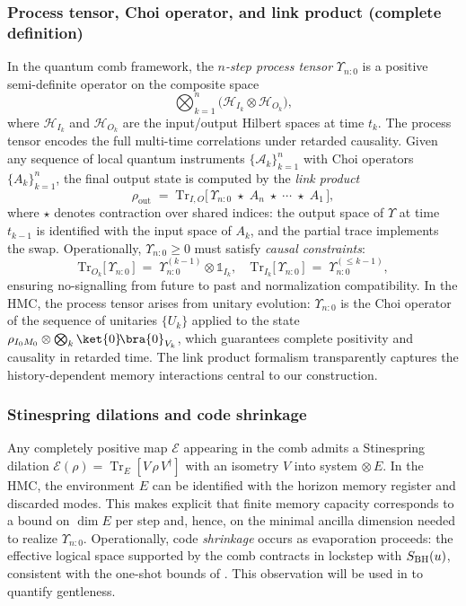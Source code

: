 \documentclass[11pt,a4paper]{article}
\newcommand{\HMC}{\textsc{HMC}\xspace}
\theoremstyle{plain}
\theoremstyle{definition}
\theoremstyle{remark}
\begin{document}
\subsubsection{Process tensor, Choi operator, and link product (complete definition)}
\label{sssec:choi-link}
In the quantum comb framework, the \emph{$n$-step process tensor} $\Upsilon_{n{:}0}$ is a positive semi-definite operator on the composite space
\[
\bigotimes_{k=1}^n \bigl(\mathcal{H}_{I_k}\otimes\mathcal{H}_{O_k}\bigr),
\]
where $\mathcal{H}_{I_k}$ and $\mathcal{H}_{O_k}$ are the input/output Hilbert spaces at time $t_k$. The process tensor encodes the full multi-time correlations under retarded causality. Given any sequence of local quantum instruments $\{\mathcal{A}_k\}_{k=1}^n$ with Choi operators $\{A_k\}_{k=1}^n$, the final output state is computed by the \emph{link product}
\begin{equation}\label{eq:link-product}
\rho_{\mathrm{out}} \;=\; \mathrm{Tr}_{I,O}\!\Big[\,\Upsilon_{n{:}0} \;\star\; A_n \;\star\; \cdots \;\star\; A_1\,\Big],
\end{equation}
where $\star$ denotes contraction over shared indices: the output space of $\Upsilon$ at time $t_{k-1}$ is identified with the input space of $A_k$, and the partial trace implements the swap. Operationally, $\Upsilon_{n{:}0}\ge 0$ must satisfy \emph{causal constraints}:
\begin{equation}
\mathrm{Tr}_{O_k}\!\bigl[\,\Upsilon_{n{:}0}\,\bigr] \;=\; \Upsilon_{n{:}0}^{(k-1)}\otimes \mathbb{1}_{I_k},
\quad \mathrm{Tr}_{I_k}\!\bigl[\,\Upsilon_{n{:}0}\,\bigr] \;=\; \Upsilon_{n{:}0}^{(\le k-1)},
\end{equation}
ensuring no-signalling from future to past and normalization compatibility. In the \HMC{}, the process tensor arises from unitary evolution: $\Upsilon_{n{:}0}$ is the Choi operator of the sequence of unitaries $\{U_k\}$ applied to the state $\rho_{I_0M_0}\otimes\bigotimes_k\ket{0}\!\bra{0}_{V_k}$, which guarantees complete positivity and causality in retarded time. The link product formalism transparently captures the history-dependent memory interactions central to our construction.


\subsubsection{Stinespring dilations and code shrinkage}
\label{sssec:dilation}
Any completely positive map $\mathcal{E}$ appearing in the comb admits a Stinespring dilation $\mathcal{E}(\rho)=\operatorname{Tr}_E[ V \, \rho \, V^\dagger ]$ with an isometry $V$ into system$\,\otimes E$. In the \HMC{}, the environment $E$ can be identified with the horizon memory register and discarded modes. This makes explicit that finite memory capacity corresponds to a bound on $\dim E$ per step and, hence, on the minimal ancilla dimension needed to realize $\Upsilon_{n{:}0}$. Operationally, code \emph{shrinkage} occurs as evaporation proceeds: the effective logical space supported by the comb contracts in lockstep with $S_{\rm BH}(u)$, consistent with the one-shot bounds of . This observation will be used in  to quantify gentleness.
\end{document}
